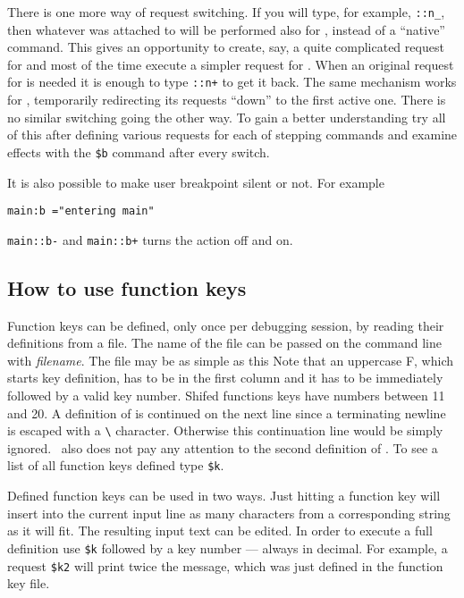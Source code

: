 There is one more way of request switching.  If you will type,
for example, \verb|::n_|, then whatever was attached to  
will be performed also for , instead of a ``native'' command.
This gives an opportunity to create, say, a quite complicated
request for  and most of the time execute a simpler
request for .
When an original request for  is
needed it is enough to type \verb|::n+| to get it back.
The same mechanism works for , temporarily redirecting
its requests ``down'' to the first active one.
There is no similar switching going the other way.
To gain a better understanding try all of this after defining
various requests for each of stepping commands and examine
effects with the \verb|$b| command after every switch.

It is also possible to make user breakpoint silent or not. For example
\begin{exmpl}
	{\tt main:b ="entering main"}
\end{exmpl}
{\tt main::b-} and {\tt main::b+} turns the action off and on.

\subsection{How to use function keys}


Function keys can be defined, only once per debugging session, by reading
their definitions from a file. The name of the file can be passed on the
command line with  {\sl filename}. The file may be as simple as this
Note that an uppercase F, which starts key definition, has to
be in the first column and it has to be immediately followed
by a valid key number.  Shifed functions keys have numbers
between 11 and 20.  A definition of  is continued on the
next line since a terminating newline is escaped with a \verb|\|
character.  Otherwise this continuation line would be simply
ignored.  \szadb\ also does not pay any attention to the second
definition of .  To see a list of all function keys defined
type \verb|$k|.

Defined function keys can be used in two ways.  Just hitting
a function key will insert into the current input line as many
characters from a corresponding string as it will fit.
The resulting input text can be edited.
In order to execute a full definition use \verb|$k| followed by a key
number --- always in decimal.
For example, a request \verb|$k2| will print twice
the message, which was just defined in the function key file.

